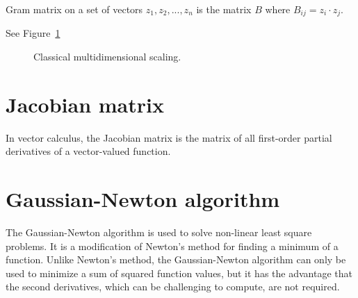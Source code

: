 Gram matrix on a set of vectors $z_1, z_2, ..., z_n$ is the matrix $B$ where
$B_{ij} = z_i \cdot z_j$.

 See Figure~\ref{fig:cms_mar}

\begin{figure}[H]
    \caption{Classical multidimensional scaling.}
    \label{fig:cms_mar}
\end{figure}


\section{Jacobian matrix} 
In vector calculus, the Jacobian matrix is the matrix of all first-order partial derivatives of a vector-valued function.

\section{Gaussian-Newton algorithm} 
The Gaussian-Newton algorithm is used to solve non-linear least square problems. It is a modification
of Newton's method for finding a minimum of a function. Unlike Newton's method, the Gaussian-Newton algorithm
can only be used to minimize a sum of squared function values, but it has the advantage that the second
derivatives, which can be challenging to compute, are not required.

